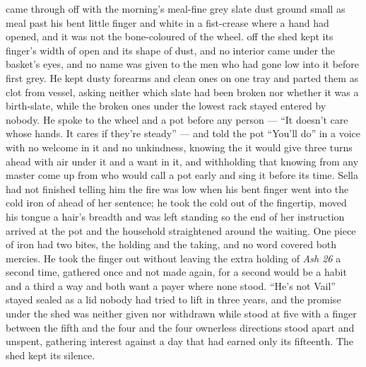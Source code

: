 came through  off  with the morning's meal-fine grey slate dust ground small as meal past his bent little finger and white in a fist-crease where a hand had opened, and it was not the bone-coloured  of the wheel.  off the shed kept its finger's width of open and its shape of dust, and no interior came under the basket's eyes, and no name was given to the men who had gone low into it before first grey. He kept dusty forearms and clean ones on one tray and parted them as clot from vessel, asking neither which slate had been broken nor whether it was a birth-slate, while the broken ones under the lowest rack stayed entered by nobody. He spoke to the wheel and a pot before any person --- “It doesn't care whose hands. It cares if they're steady” --- and told the pot “You'll do” in a voice with no welcome in it and no unkindness, knowing the  it would give three turns ahead with air under it and a want in it, and withholding that knowing from any master come up from  who would call a pot early and sing it before its time. Sella had not finished telling him the fire was low when his bent finger went into the cold iron of  ahead of her sentence; he took the cold out of the fingertip, moved his tongue a hair's breadth and was left standing so the end of her instruction arrived at the pot and the household straightened around the waiting. One piece of iron had two bites, the holding and the taking, and no  word covered both mercies. He took the finger out without leaving the extra holding of \emph{Ash 26} a second time, gathered once and not made again, for a second would be a habit and a third a way and both want a payer where none stood. “He's not Vail” stayed sealed as a lid nobody had tried to lift in three years, and the promise under the shed was neither given nor withdrawn while  stood at five with a finger between the fifth and the four and the four ownerless directions stood apart and unspent, gathering interest against a day that had earned only its fifteenth. The shed kept its silence.

